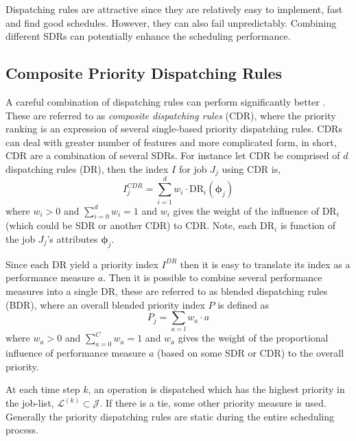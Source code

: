 \documentclass[smallextended]{svjour3}
\renewcommand{\vphi}{\bm \phi}
\begin{document}
Dispatching rules are attractive since they are relatively easy to implement, 
fast and find good schedules. However, they can also fail unpredictably. 
Combining different SDRs can potentially enhance the scheduling performance. 

\subsection{Composite Priority Dispatching Rules}\label{sec:CDR}
A careful combination of dispatching rules can perform significantly better 
\cite{Jayamohan04}. These are referred to as \emph{composite dispatching rules} 
(CDR), where the priority ranking is an expression of several single-based 
priority dispatching rules. CDRs can deal with greater number of features and 
more complicated form, in short, CDR are a combination of several SDRs. For 
instance let CDR be comprised of $d$ dispatching rules (DR), then the index $I$ 
for job $J_j$ using CDR is, 
\begin{equation}
    I_j^{CDR} = \sum_{i=1}^d w_i \cdot \text{DR}_i(\vphi_j) \label{eq:CDR}
\end{equation}
where $w_i>0$ and $\sum_{i=0}^d w_i = 1$ and $w_i$ gives the weight of the 
influence of $\text{DR}_i$ (which could be SDR or another CDR) to CDR. Note, 
each $\text{DR}_i$ is function of the job $J_j$'s attributes $\vphi_j$.  

Since each DR yield a priority index $I^{DR}$ then it is easy to translate its 
index as a performance measure $a$. Then it is possible to combine several 
performance measures into a single DR, these are referred to as blended 
dispatching rules (BDR), where an overall blended priority index $P$ is defined 
as 
\begin{equation}
    P_j = \sum_{a=l} w_a \cdot a 
\end{equation}
where $w_a>0$ and $\sum_{a=0}^C w_a = 1$ and $w_a$ gives the weight of the 
proportional influence of performance measure $a$ (based on some SDR or CDR) to 
the overall priority.


At each time step $k$, an operation is dispatched which has the highest 
priority in the job-list, $\mathcal{L}^{(k)}\subset\mathcal{J}$.  If there is a 
tie, some other priority measure is used. Generally the priority dispatching 
rules are static during the entire scheduling process.
\end{document}
